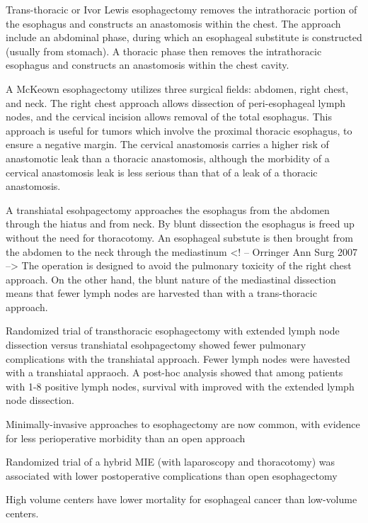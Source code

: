 \documentclass[
]{book}
\begin{document}
Trans-thoracic or Ivor Lewis esophagectomy\citep{visbal1803} removes the intrathoracic portion of the esophagus and constructs an anastomosis within the chest. The approach include an abdominal phase, during which an esophageal substitute is constructed (usually from stomach). A thoracic phase then removes the intrathoracic esophagus and constructs an anastomosis within the chest cavity.

A McKeown esophagectomy utilizes three surgical fields: abdomen, right chest, and neck. The right chest approach allows dissection of peri-esophageal lymph nodes, and the cervical incision allows removal of the total esophagus.\citep{mckeown259} This approach is useful for tumors which involve the proximal thoracic esophagus, to ensure a negative margin. The cervical anastomosis carries a higher risk of anastomotic leak than a thoracic anastomosis, although the morbidity of a cervical anastomosis leak is less serious than that of a leak of a thoracic anastomosis.

A transhiatal esohpagectomy approaches the esophagus from the abdomen through the hiatus and from neck. By blunt dissection the esophagus is freed up without the need for thoracotomy. An esophageal substute is then brought from the abdomen to the neck through the mediastinum\citep{orringer643} \citep{orringer363}\textless! -- Orringer Ann Surg 2007 --\textgreater{} The operation is designed to avoid the pulmonary toxicity of the right chest approach. On the other hand, the blunt nature of the mediastinal dissection means that fewer lymph nodes are harvested than with a trans-thoracic approach.

Randomized trial of transthoracic esophagectomy with extended lymph node dissection versus transhiatal esohpagectomy showed fewer pulmonary complications with the transhiatal approach. \citep{hulscher1662} Fewer lymph nodes were havested with a transhiatal appraoch. A post-hoc analysis showed that among patients with 1-8 positive lymph nodes, survival with improved with the extended lymph node dissection.\citep{omloo992}

Minimally-invasive approaches to esophagectomy are now common, with evidence for less perioperative morbidity than an open approach \citep{biere1887} \citep{zhoue0132889}

Randomized trial of a hybrid MIE (with laparoscopy and thoracotomy) was associated with lower postoperative complications than open esophagectomy \citep{mariette152}

High volume centers have lower mortality for esophageal cancer than low-volume centers. \citep{birkmeyer2117} \citep{wouters1789}
\end{document}
